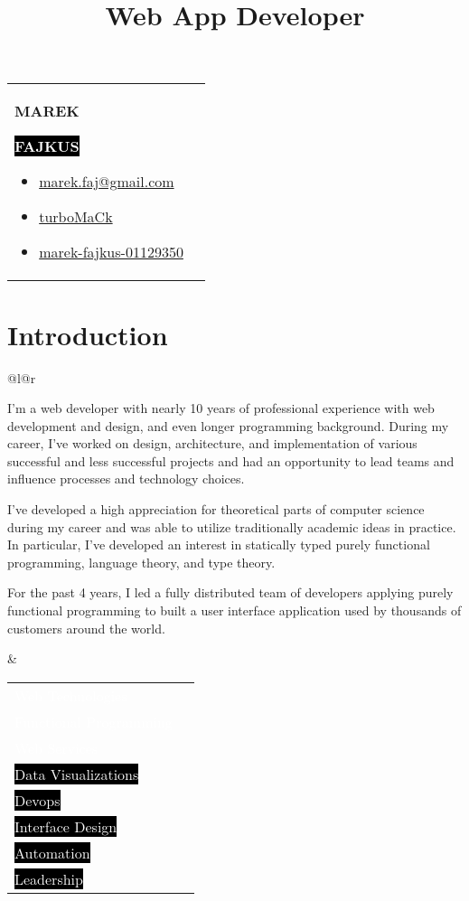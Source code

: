 \documentclass[9pt]{article}
\makeatletter
\def\firstname{Marek}
\def\lastname{Fajkus}
\def\faEmail{{\FAFR \symbol{"F0E0}}} %
\def\faLinkedin{\FAB \symbol{"F08C}} %
\def\faGithub{\FAB \symbol{"F09B}} %
\def\faStarEmpty{\FAFR \symbol{"F005}} %
\def\faStarFull{\FAFS \symbol{"F005}} %
\def\faStarHalf{\FAFS \symbol{"F5C0}} %
\renewcommand{\maketitle}{
  \begin{tabularx}{\textwidth}{@{}l l}
    \begin{minipage}[t]{0.65\textwidth}
      {\Huge \textbf {\MakeUppercase{\firstname}}}

      \vspace{0.2cm}

      \colorbox{black}{
        {\huge \textbf {\textcolor{white}{\MakeUppercase{\lastname}}}}
      }

      \vspace{0.4cm}

      {\LARGE\emph\thetitle}
    \end{minipage}

    \begin{minipage}[t]{0.35\textwidth}
      \vspace{-\baselineskip} %
      \begin{itemize}
        \itemsep0em
      \vspace{-0.5cm}
      \item \href{mailto:marek.faj@gmail.com}{
        \colorbox{ProcessBlue}{\textcolor{white}{\faEmail}} { \textcolor{ProcessBlue}{marek.faj@gmail.com}}
      }
      \item \href{https://github.com/turbomack}{
        \colorbox{black}{\textcolor{white}{\faGithub}} { turboMaCk}
      }
      \item \href{https://www.linkedin.com/in/marek-fajkus-01129350/}{
        \colorbox{black}{\textcolor{white}{\faLinkedin}} { marek-fajkus-01129350}
      }
      \end{itemize}
    \end{minipage}
  \end{tabularx}

  \vspace{0.5cm}
}
\newcommand{\skill}[3]{ %
  \colorbox{#3}{\textcolor{white}{#1}} &
  \vspace{0.2cm}
  \textcolor{#3}{
    \newcount \n
    \n #2
    \multido{\i=0+10}{5}{%
      \ifnum\n<10
        \ifnum\n>0 \faStarHalf \else \faStarEmpty \fi
      \else
        \faStarFull
      \fi
      \advance\n -10
    }
  } \\
}
\makeatother
\begin{document}
\title{Web App Developer}

\lhead{}
\rhead{}

\thispagestyle{empty}

\maketitle

\section{Introduction}

\begin{tabular}{@{}l@{\hskip 20pt}r}
    \begin{minipage}[l]{0.58\textwidth}

      I'm a web developer with nearly 10 years of professional experience
      with web development and design, and even longer programming background.
      During my career, I've worked on design, architecture, and implementation
      of various successful and less successful projects and had an opportunity
      to lead teams and influence processes and technology choices.

      \vspace{0.5em}
      I've developed a high appreciation for theoretical parts of computer science during my career
      and was able to utilize traditionally academic ideas in practice.
      In particular, I've developed an interest in statically typed purely functional programming,
      language theory, and type theory.

      \vspace{0.5em}
      For the past 4 years, I led a fully distributed team of developers applying
      purely functional programming to built a user interface application used by thousands
      of customers around the world.

    \end{minipage}
    &
    \begin{minipage}[r]{0.39\textwidth}
      \setlength\tabcolsep{5pt}
      \begin{tabularx}{\textwidth}{Xr}
        \skill{Web Technologies}{45}{ProcessBlue}
        \skill{Functional Programming}{40}{ProcessBlue}
        \skill{Web Services}{35}{ProcessBlue}
        \skill{Data Visualizations}{30}{black}
        \skill{Devops}{25}{black}
        \skill{Interface Design}{25}{black}
        \skill{Automation}{30}{black}
        \skill{Leadership}{30}{black}
      \end{tabularx}
    \end{minipage} \\
\end{tabular}
\end{document}
